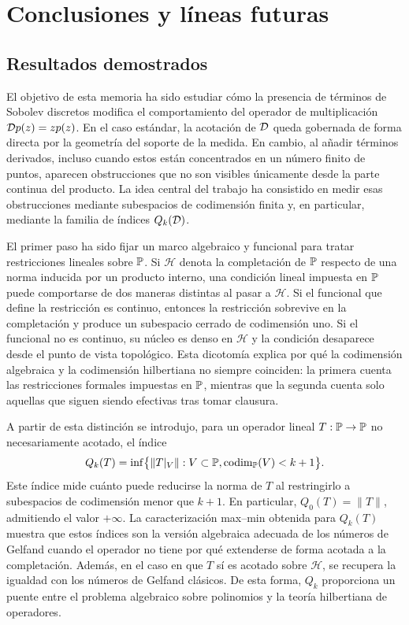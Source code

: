 \chapter{Conclusiones y líneas futuras}\label{sec:conclusiones}

\section{Resultados demostrados}
El objetivo de esta memoria ha sido estudiar cómo la presencia de términos de
Sobolev discretos modifica el comportamiento del operador de multiplicación
\(\mathcal{D} p(z)=zp(z)\). En el caso estándar, la acotación de \(\mathcal{D}\) queda gobernada
de forma directa por la geometría del soporte de la medida. En cambio, al añadir
términos derivados, incluso cuando estos están concentrados en un número finito de
puntos, aparecen obstrucciones que no son visibles únicamente desde la parte
continua del producto. La idea central del trabajo ha consistido en medir esas
obstrucciones mediante subespacios de codimensión finita y, en particular,
mediante la familia de índices \(Q_k(\mathcal{D})\).

El primer paso ha sido fijar un marco algebraico y funcional para tratar
restricciones lineales sobre \(\mathbb{P}\). Si \(\mathcal H\) denota la completación de
\(\mathbb{P}\) respecto de una norma inducida por un producto interno, una condición
lineal impuesta en \(\mathbb{P}\) puede comportarse de dos maneras distintas al pasar a
\(\mathcal H\). Si el funcional que define la restricción es continuo, entonces la
restricción sobrevive en la completación y produce un subespacio cerrado de
codimensión uno. Si el funcional no es continuo, su núcleo es denso en
\(\mathcal H\) y la condición desaparece desde el punto de vista topológico. Esta
dicotomía explica por qué la codimensión algebraica y la codimensión hilbertiana
no siempre coinciden: la primera cuenta las restricciones formales impuestas en
\(\mathbb{P}\), mientras que la segunda cuenta solo aquellas que siguen siendo efectivas
tras tomar clausura.

A partir de esta distinción se introdujo, para un operador lineal
\(T:\mathbb{P}\to\mathbb{P}\) no necesariamente acotado, el índice
\[
	Q_k(T)
	=
	\inf\bigl\{\|T|_V\|:V\subset\mathbb{P},
	\operatorname{codim}_{\mathbb{P}}(V)<k+1\bigr\}.
\]
Este índice mide cuánto puede reducirse la norma de \(T\) al restringirlo a
subespacios de codimensión menor que \(k+1\). En particular, \(Q_0(T)=\|T\|\),
admitiendo el valor \(+\infty\). La caracterización max--min obtenida para
\(Q_k(T)\) muestra que estos índices son la versión algebraica adecuada de los
números de Gelfand cuando el operador no tiene por qué extenderse de forma
acotada a la completación. Además, en el caso en que \(T\) sí es acotado sobre
\(\mathcal H\), se recupera la igualdad con los números de Gelfand clásicos. De
esta forma, \(Q_k\) proporciona un puente entre el problema algebraico sobre
polinomios y la teoría hilbertiana de operadores.

